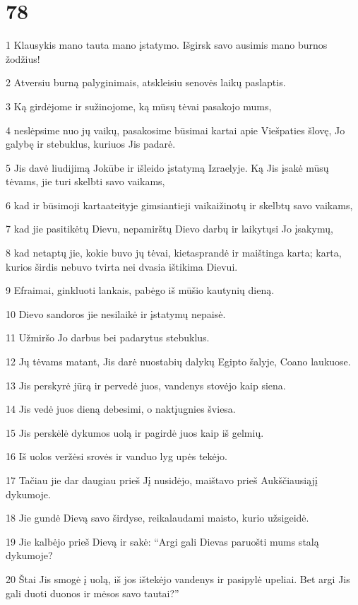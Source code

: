 \chapter{78}


\par 1 Klausykis mano tauta mano įstatymo. Išgirsk savo ausimis mano burnos žodžius! 
\par 2 Atversiu burną palyginimais, atskleisiu senovės laikų paslaptis. 
\par 3 Ką girdėjome ir sužinojome, ką mūsų tėvai pasakojo mums, 
\par 4 neslėpsime nuo jų vaikų, pasakosime būsimai kartai apie Viešpaties šlovę, Jo galybę ir stebuklus, kuriuos Jis padarė. 
\par 5 Jis davė liudijimą Jokūbe ir išleido įstatymą Izraelyje. Ką Jis įsakė mūsų tėvams, jie turi skelbti savo vaikams, 
\par 6 kad ir būsimoji karta­ateityje gimsiantieji vaikai­žinotų ir skelbtų savo vaikams, 
\par 7 kad jie pasitikėtų Dievu, nepamirštų Dievo darbų ir laikytųsi Jo įsakymų, 
\par 8 kad netaptų jie, kokie buvo jų tėvai, kietasprandė ir maištinga karta; karta, kurios širdis nebuvo tvirta nei dvasia ištikima Dievui. 
\par 9 Efraimai, ginkluoti lankais, pabėgo iš mūšio kautynių dieną. 
\par 10 Dievo sandoros jie nesilaikė ir įstatymų nepaisė. 
\par 11 Užmiršo Jo darbus bei padarytus stebuklus. 
\par 12 Jų tėvams matant, Jis darė nuostabių dalykų Egipto šalyje, Coano laukuose. 
\par 13 Jis perskyrė jūrą ir pervedė juos, vandenys stovėjo kaip siena. 
\par 14 Jis vedė juos dieną debesimi, o naktį­ugnies šviesa. 
\par 15 Jis perskėlė dykumos uolą ir pagirdė juos kaip iš gelmių. 
\par 16 Iš uolos veržėsi srovės ir vanduo lyg upės tekėjo. 
\par 17 Tačiau jie dar daugiau prieš Jį nusidėjo, maištavo prieš Aukščiausiąjį dykumoje. 
\par 18 Jie gundė Dievą savo širdyse, reikalaudami maisto, kurio užsigeidė. 
\par 19 Jie kalbėjo prieš Dievą ir sakė: “Argi gali Dievas paruošti mums stalą dykumoje? 
\par 20 Štai Jis smogė į uolą, iš jos ištekėjo vandenys ir pasipylė upeliai. Bet argi Jis gali duoti duonos ir mėsos savo tautai?” 
